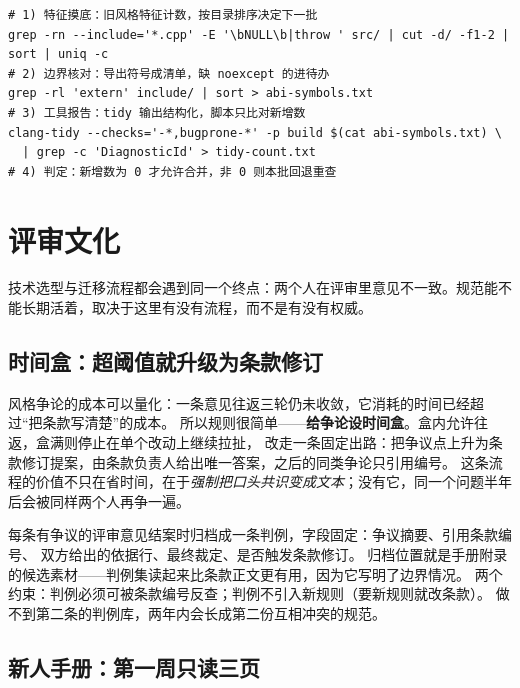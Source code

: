 \documentclass[12pt,a4paper,fontset=fandol]{ctexbook}
\begin{document}
\begin{lstlisting}[style=shellstyle]
# 1) 特征摸底：旧风格特征计数，按目录排序决定下一批
grep -rn --include='*.cpp' -E '\bNULL\b|throw ' src/ | cut -d/ -f1-2 | sort | uniq -c
# 2) 边界核对：导出符号成清单，缺 noexcept 的进待办
grep -rl 'extern' include/ | sort > abi-symbols.txt
# 3) 工具报告：tidy 输出结构化，脚本只比对新增数
clang-tidy --checks='-*,bugprone-*' -p build $(cat abi-symbols.txt) \
  | grep -c 'DiagnosticId' > tidy-count.txt
# 4) 判定：新增数为 0 才允许合并，非 0 则本批回退重查
\end{lstlisting}

\section{评审文化}
\label{sec:ch14-review}

技术选型与迁移流程都会遇到同一个终点：两个人在评审里意见不一致。规范能不能长期活着，取决于这里有没有流程，而不是有没有权威。

\subsection{时间盒：超阈值就升级为条款修订}
\label{sec:ch14-timebox}

风格争论的成本可以量化：一条意见往返三轮仍未收敛，它消耗的时间已经超过``把条款写清楚''的成本。
所以规则很简单——\textbf{给争论设时间盒}。盒内允许往返，盒满则停止在单个改动上继续拉扯，
改走一条固定出路：把争议点上升为条款修订提案，由条款负责人给出唯一答案，之后的同类争论只引用编号。
这条流程的价值不只在省时间，在于\emph{强制把口头共识变成文本}；没有它，同一个问题半年后会被同样两个人再争一遍。

\begin{bestpractice}[title={判例库：让每个争议只处理一次}]
  每条有争议的评审意见结案时归档成一条判例，字段固定：争议摘要、引用条款编号、
  双方给出的依据行、最终裁定、是否触发条款修订。
  归档位置就是手册附录的候选素材——判例集读起来比条款正文更有用，因为它写明了边界情况。
  两个约束：判例必须可被条款编号反查；判例不引入新规则（要新规则就改条款）。
  做不到第二条的判例库，两年内会长成第二份互相冲突的规范。
\end{bestpractice}

\subsection{新人手册：第一周只读三页}
\label{sec:ch14-onboarding}
\end{document}
